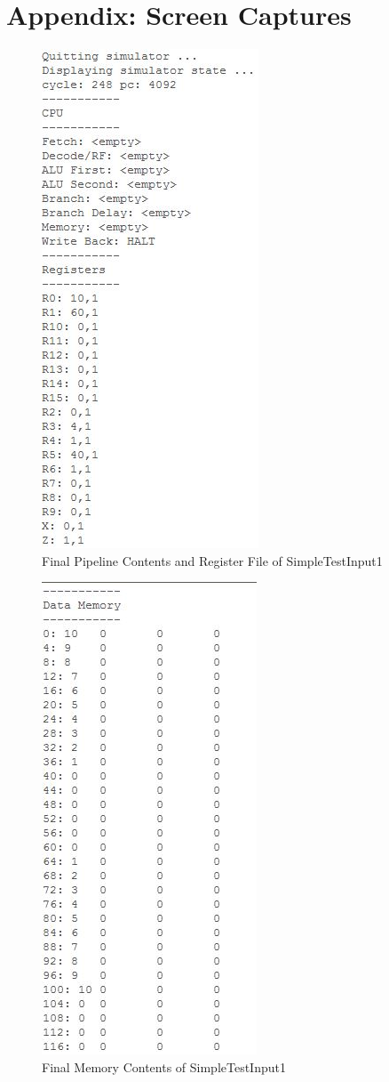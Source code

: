 \documentclass[12pt]{article}
\begin{document}
\newpage
\appendix
\section{Appendix: Screen Captures}
\begin{figure}
  \includegraphics{./figs/sti1pipereg.jpg}
  \caption{Final Pipeline Contents and Register File of SimpleTestInput1}
  \label{fig:sti1pipereg}
\end{figure}
\begin{figure}
  \includegraphics{./figs/sti1mem.jpg}
  \caption{Final Memory Contents of SimpleTestInput1}
  \label{fig:sti1mem}
\end{figure}
\end{document}
